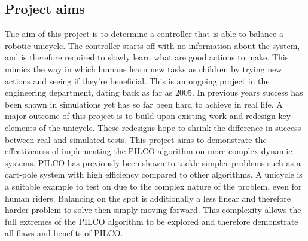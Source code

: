 \documentclass[twoside,twocolumn,12pt]{article}
\begin{document}
\subsection{Project aims}
\lettrine[nindent=0em,lines=3]{T}he aim of this project is to determine a controller that is able to balance a robotic unicycle. The controller starts off with no information about the system, and is therefore required to slowly learn what are good actions to make. This mimics the way in which humans learn new tasks as children by trying new actions and seeing if they're beneficial.
\newline
This is an ongoing project in the engineering department, dating back as far as 2005. In previous years success has been shown in simulations yet has so far been hard to achieve in real life. A major outcome of this project is to build upon existing  work and redesign key elements of the unicycle. These redesigns hope to shrink the difference in success between real and simulated tests. 
\newline
This project aims to demonstrate the effectiveness of implementing the PILCO algorithm \cite{pilco} on more complex dynamic systems. PILCO has previously been shown to tackle simpler problems such as a cart-pole system with high efficiency compared to other algorithms. 
\newline 
A unicycle is a suitable example to test on due to the complex nature of the problem, even for human riders. Balancing on the spot is additionally a less linear and therefore harder problem to solve then simply moving forward. This complexity allows the full extremes of the PILCO algorithm to be explored and therefore demonstrate all flaws and benefits of PILCO.
\end{document}
